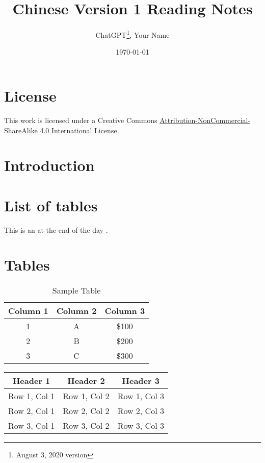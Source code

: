 \documentclass[12pt,a4paper]{article}
\begin{document}
\begin{CJK*}{UTF8}{gbsn} %

\title{Chinese Version 1 Reading Notes}
\author{ChatGPT\footnote{August 3, 2020 version}, Your Name}
\date{\today}
\maketitle



\section{License}
This work is licensed under a Creative Commons \href{https://creativecommons.org/licenses/by-nc-sa/4.0/}{Attribution-NonCommercial-ShareAlike 4.0 International License}.

\section{Introduction}



\section{List of tables}

\listoffigures    %

\listoftables  %

This is an  at the end of the day .


\section{Tables}
\begin{table}[ht]
    \centering
    \caption{Sample Table}
    \label{tab:sample}
    \begin{tabular}{|c|c|c|}
        \hline
        \textbf{Column 1} & \textbf{Column 2} & \textbf{Column 3} \\
        \hline
        1 & A & \$100 \\
        \hline
        2 & B & \$200 \\
        3 & C & \$300 \\
        \hline
    \end{tabular}
\end{table}

\begin{minipage}{\linewidth}
\begin{tabular}{|c|c|c|}
    \hline
    \textbf{Header 1} & \textbf{Header 2} & \textbf{Header 3} \\
    \hline
    Row 1, Col 1 & Row 1, Col 2 & Row 1, Col 3 \\
    \hline
    Row 2, Col 1 & Row 2, Col 2 & Row 2, Col 3 \\
    \hline
    Row 3, Col 1 & Row 3, Col 2 & Row 3, Col 3 \\
    \hline
\end{tabular}
\end{minipage}


\end{CJK*}
\end{document}

